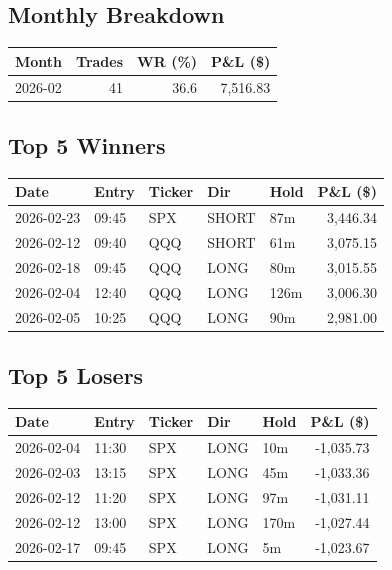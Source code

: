 \documentclass[11pt,a4paper,twoside]{article}
\begin{document}
\subsection{Monthly Breakdown}
\noindent\begin{center}
\begin{tabular}{>{\color{txtmain}}l rrr}
\toprule
\rowcolor{cardbg}
\textbf{Month} & \textbf{Trades} & \textbf{WR (\%)} & \textbf{P\&L (\$)} \\
\midrule
2026-02 & 41 & 36.6 & \textcolor{wingreen}{7,516.83} \\
\bottomrule
\end{tabular}
\end{center}
\subsection{Top 5 Winners}
\noindent\begin{center}
\begin{tabular}{>{\color{txtmain}}l llll r}
\toprule
\rowcolor{cardbg}
\textbf{Date} & \textbf{Entry} & \textbf{Ticker} & \textbf{Dir} & \textbf{Hold} & \textbf{P\&L (\$)} \\
\midrule
2026-02-23 & 09:45 & SPX & SHORT & 87m & \textcolor{wingreen}{3,446.34} \\
2026-02-12 & 09:40 & QQQ & SHORT & 61m & \textcolor{wingreen}{3,075.15} \\
2026-02-18 & 09:45 & QQQ & LONG & 80m & \textcolor{wingreen}{3,015.55} \\
2026-02-04 & 12:40 & QQQ & LONG & 126m & \textcolor{wingreen}{3,006.30} \\
2026-02-05 & 10:25 & QQQ & LONG & 90m & \textcolor{wingreen}{2,981.00} \\
\bottomrule
\end{tabular}
\end{center}
\subsection{Top 5 Losers}
\noindent\begin{center}
\begin{tabular}{>{\color{txtmain}}l llll r}
\toprule
\rowcolor{cardbg}
\textbf{Date} & \textbf{Entry} & \textbf{Ticker} & \textbf{Dir} & \textbf{Hold} & \textbf{P\&L (\$)} \\
\midrule
2026-02-04 & 11:30 & SPX & LONG & 10m & \textcolor{lossred}{-1,035.73} \\
2026-02-03 & 13:15 & SPX & LONG & 45m & \textcolor{lossred}{-1,033.36} \\
2026-02-12 & 11:20 & SPX & LONG & 97m & \textcolor{lossred}{-1,031.11} \\
2026-02-12 & 13:00 & SPX & LONG & 170m & \textcolor{lossred}{-1,027.44} \\
2026-02-17 & 09:45 & SPX & LONG & 5m & \textcolor{lossred}{-1,023.67} \\
\bottomrule
\end{tabular}
\end{center}
\clearpage
\end{document}
